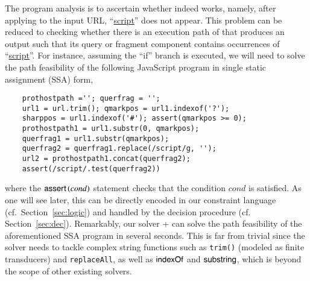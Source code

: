 

The program analysis is to ascertain whether {\urlxsssanitise} indeed works, namely, after applying {\urlxsssanitise} to the input URL, ``\url{script}'' does not appear.  This problem can be reduced to checking whether there is an execution path of {\urlxsssanitise} that produces an output such that its query or fragment component contains occurrences of ``\url{script}''. For instance, assuming  the ``if'' branch is executed, %
we will need to solve the path feasibility of the following JavaScript program in single static assignment (SSA) form,
%
{\small
\begin{verbatim}
    prothostpath =''; querfrag = '';
    url1 = url.trim(); qmarkpos = url1.indexof('?');
    sharppos = url1.indexof('#'); assert(qmarkpos >= 0); 
    prothostpath1 = url1.substr(0, qmarkpos);
    querfrag1 = url1.substr(qmarkpos);
    querfrag2 = querfrag1.replace(/script/g, '');
    url2 = prothostpath1.concat(querfrag2);
    assert(/script/.test(querfrag2))
\end{verbatim}
}
\noindent where the $\textsf{assert}\left(cond\right)$ statement checks that the condition $cond$ is satisfied. As one will see later, this can be directly encoded in our constraint language (cf.\ Section~\ref{sec:logic}) and handled by the decision procedure (cf. Section~\ref{sec:dec}). 
Remarkably, our solver  {\ostrich}+ can solve the path feasibility of the aforementioned SSA program in several seconds. This is far from trivial since %
the solver needs to tackle complex string functions such as {\tt trim()} (modeled as finite transducers) and {\tt replaceAll}, %
as well as %
$\mathsf{indexOf}$  and $\mathsf{substring}$, which is beyond the scope of other existing solvers.  
